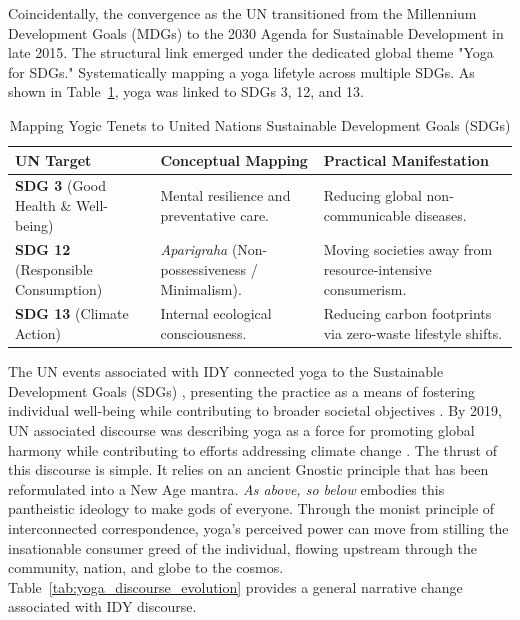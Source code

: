 \documentclass[11pt]{article}
\begin{document}
Coincidentally, the convergence as the UN transitioned from the Millennium Development Goals (MDGs) to the 2030 Agenda for Sustainable Development in late 2015. The structural link emerged under the dedicated global theme "Yoga for SDGs." Systematically mapping a yoga lifetyle across multiple SDGs. As shown in Table~\ref{tab:yoga_sdg_mapping}, yoga was linked to SDGs 3, 12, and 13.

\begin{table}[htbp]
\centering
\caption{Mapping Yogic Tenets to United Nations Sustainable Development Goals (SDGs)}
\label{tab:yoga_sdg_mapping}
\begin{tabular}{p{4.5cm} p{5cm} p{5.5cm}}
\hline
\textbf{UN Target} & \textbf{Conceptual Mapping} & \textbf{Practical Manifestation} \\ \hline
\textbf{SDG 3} (Good Health \& Well-being) & Mental resilience and preventative care. & Reducing global non-communicable diseases. \\ \hline
\textbf{SDG 12} (Responsible Consumption) & \textit{Aparigraha} (Non-possessiveness / Minimalism). & Moving societies away from resource-intensive consumerism. \\ \hline
\textbf{SDG 13} (Climate Action) & Internal ecological consciousness. & Reducing carbon footprints via zero-waste lifestyle shifts. \\ \hline
\end{tabular}
\end{table}


The UN events associated with IDY connected yoga to the Sustainable Development Goals (SDGs) \cite{bhagwat2019} , presenting the practice as a means of fostering individual well-being while contributing to broader societal objectives \cite{un2016a,un2016b}. By 2019, UN associated discourse was describing yoga as a force for promoting global harmony while contributing to efforts addressing climate change \cite{un2019}. The thrust of this discourse is simple. It relies on an ancient Gnostic principle that has been reformulated into a New Age mantra. \emph{As above, so below} embodies this pantheistic ideology to make gods of everyone. Through the monist principle of interconnected correspondence, yoga's perceived power can move from stilling the insationable consumer greed of the individual, flowing upstream through the community, nation, and globe to the cosmos. Table~\ref{tab:yoga_discourse_evolution} provides a general narrative change associated with IDY discourse.
\end{document}
